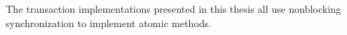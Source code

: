 The transaction implementations presented in this thesis all use
nonblocking synchronization to implement atomic methods.


